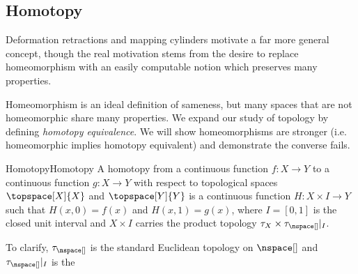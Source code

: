     \subsection{Homotopy}
        Deformation retractions and mapping cylinders motivate a far
        more general concept, though the real motivation stems from the
        desire to replace homeomorphism with an easily computable
        notion which preserves many properties.
        \par\hfill\par
        \begin{minipage}[t]{0.50\textwidth}
            Homeomorphism is an ideal definition of sameness, but many
            spaces that are not homeomorphic share many properties. We
            expand our study of topology by defining
            \textit{homotopy equivalence}. We will show homeomorphisms
            are stronger (i.e. homeomorphic implies homotopy
            equivalent) and demonstrate the converse fails.
        \end{minipage}
        \hfill
        \par\vspace{2.5ex}
        \begin{fdefinition}{Homotopy}{Homotopy}
            A homotopy from a continuous function $f:X\rightarrow{Y}$ to
            a continuous function $g:X\rightarrow{Y}$ with respect to
            topological spaces $\topspace[X]{X}$ and $\topspace[Y]{Y}$
            is a continuous function $H:{X}\times{I}\rightarrow{Y}$ such
            that $H(x,0)=f(x)$ and $H(x,1)=g(x)$, where $I=[0,1]$ is the
            closed unit interval and $X\times{I}$ carries the product
            topology $\tau_{X}\times\tau_{\nspace[]}|_{I}$.
        \end{fdefinition}
        To clarify, $\tau_{\nspace[]}$ is the standard Euclidean
        topology on $\nspace[]$ and $\tau_{\nspace[]}|_{I}$ is the
